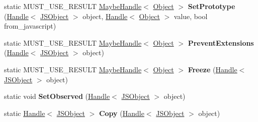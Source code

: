 \begin{DoxyCompactItemize}
\item 
\hypertarget{classv8_1_1internal_1_1_j_s_object_a9f7f338b8cf6710ad181cbff8067fc5a}{}static M\+U\+S\+T\+\_\+\+U\+S\+E\+\_\+\+R\+E\+S\+U\+L\+T \hyperlink{classv8_1_1internal_1_1_maybe_handle}{Maybe\+Handle}$<$ \hyperlink{classv8_1_1internal_1_1_object}{Object} $>$ {\bfseries Set\+Prototype} (\hyperlink{classv8_1_1internal_1_1_handle}{Handle}$<$ \hyperlink{classv8_1_1internal_1_1_j_s_object}{J\+S\+Object} $>$ object, \hyperlink{classv8_1_1internal_1_1_handle}{Handle}$<$ \hyperlink{classv8_1_1internal_1_1_object}{Object} $>$ value, bool from\+\_\+javascript)\label{classv8_1_1internal_1_1_j_s_object_a9f7f338b8cf6710ad181cbff8067fc5a}

\item 
\hypertarget{classv8_1_1internal_1_1_j_s_object_aa22b44cca1533f4dbd50756774a7b25a}{}static M\+U\+S\+T\+\_\+\+U\+S\+E\+\_\+\+R\+E\+S\+U\+L\+T \hyperlink{classv8_1_1internal_1_1_maybe_handle}{Maybe\+Handle}$<$ \hyperlink{classv8_1_1internal_1_1_object}{Object} $>$ {\bfseries Prevent\+Extensions} (\hyperlink{classv8_1_1internal_1_1_handle}{Handle}$<$ \hyperlink{classv8_1_1internal_1_1_j_s_object}{J\+S\+Object} $>$ object)\label{classv8_1_1internal_1_1_j_s_object_aa22b44cca1533f4dbd50756774a7b25a}

\item 
\hypertarget{classv8_1_1internal_1_1_j_s_object_a2a2a0919060a321854664c97c9adc3ce}{}static M\+U\+S\+T\+\_\+\+U\+S\+E\+\_\+\+R\+E\+S\+U\+L\+T \hyperlink{classv8_1_1internal_1_1_maybe_handle}{Maybe\+Handle}$<$ \hyperlink{classv8_1_1internal_1_1_object}{Object} $>$ {\bfseries Freeze} (\hyperlink{classv8_1_1internal_1_1_handle}{Handle}$<$ \hyperlink{classv8_1_1internal_1_1_j_s_object}{J\+S\+Object} $>$ object)\label{classv8_1_1internal_1_1_j_s_object_a2a2a0919060a321854664c97c9adc3ce}

\item 
\hypertarget{classv8_1_1internal_1_1_j_s_object_a27d334bd7c3c1c379d32b6b142131078}{}static void {\bfseries Set\+Observed} (\hyperlink{classv8_1_1internal_1_1_handle}{Handle}$<$ \hyperlink{classv8_1_1internal_1_1_j_s_object}{J\+S\+Object} $>$ object)\label{classv8_1_1internal_1_1_j_s_object_a27d334bd7c3c1c379d32b6b142131078}

\item 
\hypertarget{classv8_1_1internal_1_1_j_s_object_a0a20216c65e6636cb0fb5f2607177847}{}static \hyperlink{classv8_1_1internal_1_1_handle}{Handle}$<$ \hyperlink{classv8_1_1internal_1_1_j_s_object}{J\+S\+Object} $>$ {\bfseries Copy} (\hyperlink{classv8_1_1internal_1_1_handle}{Handle}$<$ \hyperlink{classv8_1_1internal_1_1_j_s_object}{J\+S\+Object} $>$ object)\label{classv8_1_1internal_1_1_j_s_object_a0a20216c65e6636cb0fb5f2607177847}


\end{DoxyCompactItemize}
